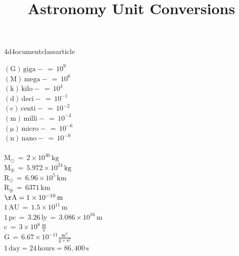 4\4d4ocumentclass{article}
\usepackage[utf8]{inputenc}
\usepackage{multicol}
\usepackage[legalpaper, portrait, margin=1.5in]{geometry}

\title{Astronomy Unit Conversions}
\author{}
\date{}



\maketitle

\Large{
\noindent
$\mathrm{(G) \, giga-} \, = \, 10^{9}$
\\
$\mathrm{(M) \, mega-} \, = \, 10^{6}$
\\
$\mathrm{(k) \, kilo-} \, = \, 10^{3}$
\\
$\mathrm{(d) \, deci-} \, = \, 10^{-1}$
\\
$\mathrm{(c) \, centi-} \, = \, 10^{-2}$
\\
$\mathrm{(m) \, milli-} \, = \, 10^{-3}$
\\
$\mathrm{(\mu) \, micro-} \, = \, 10^{-6}$
\\
$\mathrm{(n) \, nano-} \, = \, 10^{-9}$
\\ \\
$\mathrm{M_\odot} \, = \, 2\times10^{30} \, \mathrm{kg} $
\\
$\mathrm{M_\oplus} \, = \, 5.972\times10^{24} \, \mathrm{kg} $
\\
$\mathrm{R_\odot} \, = \, 6.96 \times 10^5 \, \mathrm{km}$
\\
$\mathrm{R_\oplus} \, = \, 6371 \, \mathrm{km}$
\\
$\mathrm{\AA} = 1 \times 10^{-10} \,\mathrm{m}$
\\
$1\, \mathrm{AU} \, = \, 1.5 \times 10^{11} \,\mathrm{m}$
\\
$1 \, \mathrm{pc} \, = \, 3.26 \, \mathrm{ly} \, = \, 3.086 \times 10^{16} \, \mathrm{m}$
\\
$\mathrm{c} \, = \, 3 \times 10^{8} \, \mathrm{\frac{m}{s}}$
\\
$\mathrm{G} \, = \, 6.67 \times 10^{-11} \mathrm{\frac{m^3}{g \times s^2}}$
\\
$1\,\mathrm{day} = 24 \,\mathrm{hours}  =  86,400 \,\mathrm{s}$
}


